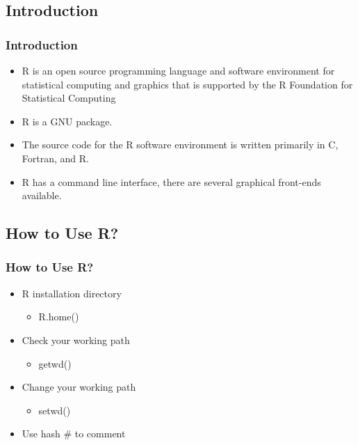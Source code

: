 \documentclass[12pt]{beamer}
\begin{document}
\begin{frame}
\section{Introduction}
\frametitle{Introduction }
	\begin{itemize}\justifying
		\item R is an open source programming language and software environment for statistical computing and graphics that is supported by the R Foundation for Statistical Computing
	  		\item R is a GNU package.
	  		\item The source code for the R software environment is written primarily in C, Fortran, and R.
			\item R has a command line interface, there are several graphical front-ends available.
	\end{itemize}
\end{frame}
\begin{frame}
\section{How to Use R?}
\frametitle{How to Use R?}
\begin{itemize}\justifying
	\item R installation directory
	\begin{itemize}
		\item R.home()
	\end{itemize}
	\item Check your working path
	\begin{itemize}
		\item getwd()
	\end{itemize}
	\item Change your working path
		\begin{itemize}
		\item setwd()
	\end{itemize}
	\item Use hash \# to comment
\end{itemize}
\end{frame}
\end{document}
